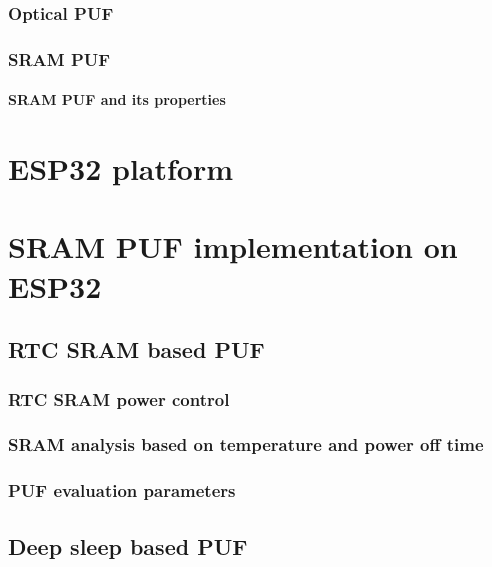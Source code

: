 \subsection{Optical PUF}\label{sec:optical_puf}
\subsection{SRAM PUF}
\subsubsection*{SRAM PUF and its properties}\label{sec:srampuf_properties}

\chapter{ESP32 platform}

\chapter{SRAM PUF implementation on ESP32}

\section{RTC SRAM based PUF}

\subsection{RTC SRAM power control}
\subsection{SRAM analysis based on temperature and power off time}
\subsection{PUF evaluation parameters}\label{sec:rtc_evaluation}

\section{Deep sleep based PUF}

